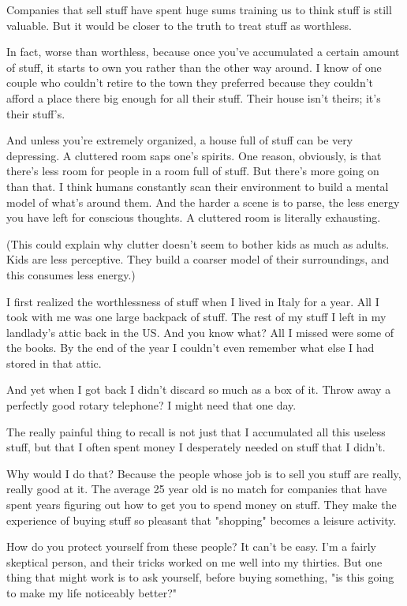 Companies that sell stuff have spent huge sums training us to think
stuff is still valuable.  But it would be closer to the truth to
treat stuff as worthless.

In fact, worse than worthless, because once you've accumulated a
certain amount of stuff, it starts to own you rather than the other
way around.  I know of one couple who couldn't retire to the town
they preferred because they couldn't afford a place there big enough
for all their stuff.  Their house isn't theirs; it's their stuff's.

And unless you're extremely organized, a house full of stuff can
be very depressing. A cluttered room saps one's spirits.  One
reason, obviously, is that there's less room for people in a room
full of stuff.  But there's more going on than that.  I think humans
constantly scan their environment to build a mental model of what's
around them.  And the harder a scene is to parse, the less energy
you have left for conscious thoughts.  A cluttered room is literally
exhausting.

(This could explain why clutter doesn't seem to bother kids as much
as adults. Kids are less perceptive.  They build a coarser model
of their surroundings, and this consumes less energy.)

I first realized the worthlessness of stuff when I lived in Italy
for a year.  All I took with me was one large backpack of stuff.
The rest of my stuff I left in my landlady's attic back in the US.
And you know what?  All I missed were some of the books.  By the
end of the year I couldn't even remember what else I had stored in
that attic.

And yet when I got back I didn't discard so much as a box of it.
Throw away a perfectly good rotary telephone?  I might need that
one day.

The really painful thing to recall is not just that I accumulated
all this useless stuff, but that I often spent money I desperately
needed on stuff that I didn't.

Why would I do that?  Because the people whose job is to sell you
stuff are really, really good at it.  The average 25 year old is
no match for companies that have spent years figuring out how to
get you to spend money on stuff.  They make the experience of buying
stuff so pleasant that "shopping" becomes a leisure activity.

How do you protect yourself from these people?  It can't be easy.
I'm a fairly skeptical person, and their tricks worked on me well
into my thirties.  But one thing that might work is to ask yourself,
before buying something, "is this going to make my life noticeably
better?"

